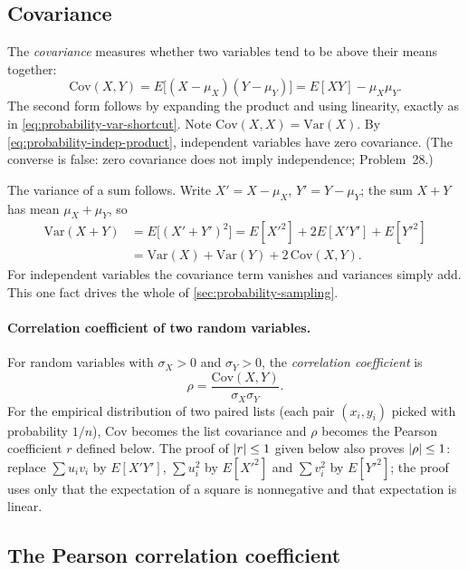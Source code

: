 \subsection{Covariance}

The \emph{covariance} measures whether two variables tend to be above their means together:
\begin{equation}
\mathrm{Cov}(X,Y)=E\bigl[(X-\mu_X)(Y-\mu_Y)\bigr] = E[XY]-\mu_X\mu_Y .
\label{eq:probability-cov}
\end{equation}
The second form follows by expanding the product and using linearity, exactly as in \cref{eq:probability-var-shortcut}. Note $\mathrm{Cov}(X,X)=\mathrm{Var}(X)$. By \cref{eq:probability-indep-product}, independent variables have zero covariance. (The converse is false: zero covariance does not imply independence; Problem~28.)

The variance of a sum follows. Write $X'=X-\mu_X$, $Y'=Y-\mu_Y$; the sum $X+Y$ has mean $\mu_X+\mu_Y$, so
\begin{align}
\mathrm{Var}(X+Y) &= E\bigl[(X'+Y')^2\bigr] = E[X'^2]+2E[X'Y']+E[Y'^2]\nonumber\\
&= \mathrm{Var}(X)+\mathrm{Var}(Y)+2\,\mathrm{Cov}(X,Y).
\label{eq:probability-var-sum}
\end{align}
For independent variables the covariance term vanishes and variances simply add. This one fact drives the whole of \cref{sec:probability-sampling}.

\paragraph{Correlation coefficient of two random variables.} For random variables with $\sigma_X>0$ and $\sigma_Y>0$, the \emph{correlation coefficient} is
\begin{equation}
\rho=\frac{\mathrm{Cov}(X,Y)}{\sigma_X\sigma_Y}.
\label{eq:probability-rho}
\end{equation}
For the empirical distribution of two paired lists (each pair $(x_i,y_i)$ picked with probability $1/n$), $\mathrm{Cov}$ becomes the list covariance and $\rho$ becomes the Pearson coefficient $r$ defined below. The proof of $\left\lvert r\right\rvert\le1$ given below also proves $\left\lvert \rho\right\rvert\le1$: replace $\sum u_iv_i$ by $E[X'Y']$, $\sum u_i^2$ by $E[X'^2]$ and $\sum v_i^2$ by $E[Y'^2]$; the proof uses only that the expectation of a square is nonnegative and that expectation is linear.

\subsection{The Pearson correlation coefficient}

